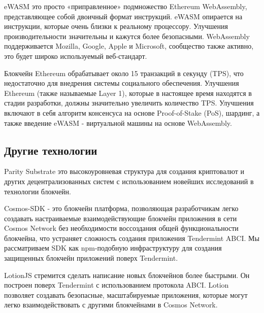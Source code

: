 eWASM это просто «приправленное» подмножество Ethereum WebAssembly, представляющее собой двоичный формат инструкций. eWASM опирается на инструкции, которые очень близки к реальному процессору. Улучшения производительности значительны и кажутся более безопасными. WebAssembly поддерживается Mozilla, Google, Apple и Microsoft, сообщество также активно, это будет широко используемый веб-стандарт. 

Блокчейн Ethereum обрабатывает около 15 транзакций в секунду (TPS), что недостаточно для внедрения системы социального обеспечения. Улучшения Ethereum (также называемые Layer 1), которые в настоящее время находятся в стадии разработки, должны значительно увеличить количество TPS. Улучшения включают в себя алгоритм консенсуса на основе Proof-of-Stake (PoS), шардинг, а также введение eWASM - виртуальной машины на основе WebAssembly.

\subsection{Другие технологии}
Parity Substrate это высокоуровневая структура для создания криптовалют и других децентрализованных систем с использованием новейших исследований в технологии блокчейн. 

Cosmos-SDK - это блокчейн платформа, позволяющая разработчикам легко создавать настраиваемые взаимодействующие блокчейн приложения в сети Cosmos Network без необходимости воссоздания общей функциональности блокчейна, что устраняет сложность создания приложения Tendermint ABCI. Мы рассматриваем SDK как npm-подобную инфраструктуру для создания защищенных блокчейн приложений поверх Tendermint.

LotionJS стремится сделать написание новых блокчейнов более быстрыми. Он построен поверх Tendermint с использованием протокола ABCI. Lotion позволяет создавать безопасные, масштабируемые приложения, которые могут легко взаимодействовать с другими блокчейнами в Cosmos Network.

